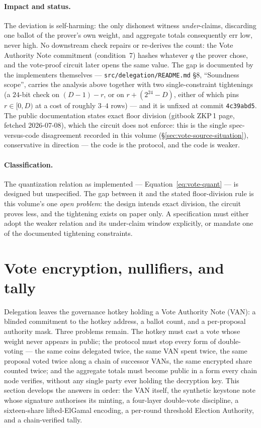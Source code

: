 \documentclass[11pt,a4paper]{article}
\theoremstyle{definition}
\begin{document}
\paragraph{Impact and status.} The deviation is self-harming: the only
dishonest witness \emph{under}-claims, discarding one ballot of the
prover's own weight, and aggregate totals consequently err low, never
high. No downstream check repairs or re-derives the count: the Vote
Authority Note commitment (condition~7) hashes whatever $q$ the prover
chose, and the vote-proof circuit later opens the same value. The gap is
documented by the implementers themselves ---
\texttt{src/delegation/README.md} \S8, ``Soundness scope'', carries the
analysis above together with two single-constraint tightenings (a
$24$-bit check on $(D - 1) - r$, or on $r + (2^{24} - D)$, either of
which pins $r \in [0, D)$ at a cost of roughly $3$--$4$ rows) --- and it
is unfixed at commit \texttt{4c39abd5}. The public documentation states
exact floor division (gitbook ZKP\,1 page, fetched 2026-07-08), which the
circuit does not enforce: this is the single spec-versus-code
disagreement recorded in this volume
(\S\ref{sec:vote-source-situation}), conservative in direction --- the
code is the protocol, and the code is weaker.

\paragraph{Classification.} The quantization relation as implemented ---
Equation~\eqref{eq:vote-quant} --- is designed but unspecified. The gap
between it and the stated floor-division rule is this volume's one
\emph{open problem}: the design intends exact division, the circuit
proves less, and the tightening exists on paper only. A specification
must either adopt the weaker relation and its under-claim window
explicitly, or mandate one of the documented tightening constraints.

\section{Vote encryption, nullifiers, and tally}\label{sec:vote-tally}

Delegation leaves the governance hotkey holding a Vote Authority Note (VAN): a
blinded commitment to the hotkey address, a ballot count, and a per-proposal
authority mask. Three problems remain. The hotkey must cast a vote whose
weight never appears in public; the protocol must stop every form of
double-voting --- the same coins delegated twice, the same VAN spent twice,
the same proposal voted twice along a chain of successor VANs, the same
encrypted share counted twice; and the aggregate totals must become public in
a form every chain node verifies, without any single party ever holding the
decryption key. This section develops the answers in order: the VAN itself,
the synthetic keystone note whose signature authorises its minting, a
four-layer double-vote discipline, a sixteen-share lifted-ElGamal encoding, a
per-round threshold Election Authority, and a chain-verified tally.
\end{document}
